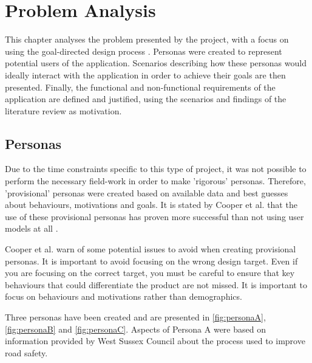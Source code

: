 \documentclass[authoryearcitations]{UoYCSproject}
\begin{document}
\chapter{Problem Analysis}

This chapter analyses the problem presented by the project, with a focus on using the goal-directed design process \citep{Cooper2007}. Personas were created to represent potential users of the application. Scenarios describing how these personas would ideally interact with the application in order to achieve their goals are then presented. Finally, the functional and non-functional requirements of the application are defined and justified, using the scenarios and findings of the literature review as motivation. 

\section{Personas} 

Due to the time constraints specific to this type of project, it was not possible to perform the necessary field-work in order to make 'rigorous' personas. Therefore, 'provisional' personas were created based on available data and best guesses about behaviours, motivations and goals. It is stated by Cooper et al. that the use of these provisional personas has proven more successful than not using user models at all \citep{Cooper2007}. 

Cooper et al. warn of some potential issues to avoid when creating provisional personas. It is important to avoid focusing on the wrong design target. Even if you are focusing on the correct target, you must be careful to ensure that key behaviours that could differentiate the product are not missed. It is important to focus on behaviours and motivations rather than demographics.

Three personas have been created and are presented in \autoref{fig:personaA}, \autoref{fig:personaB} and \autoref{fig:personaC}. Aspects of Persona A were based on information provided by West Sussex Council about the process used to improve road safety\citep{WestSussexCountyCouncil}.
\end{document}
